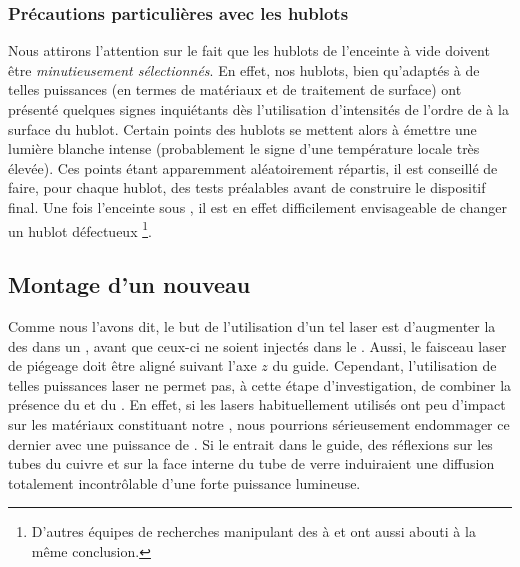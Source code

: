 \subsubsection{Précautions particulières avec les hublots}
Nous attirons l'attention sur le fait que les hublots de l'enceinte à vide doivent être \emph{minutieusement sélectionnés}. En effet, nos hublots, bien qu'adaptés à de telles puissances (en termes de matériaux et de traitement de surface) ont présenté quelques signes inquiétants dès l'utilisation d'intensités de l'ordre de  à la surface du hublot. Certain points des hublots se mettent alors à émettre une lumière blanche intense (probablement le signe d'une température locale très élevée). Ces points étant apparemment aléatoirement répartis, il est conseillé de faire, pour chaque hublot, des tests préalables avant de construire le dispositif final. Une fois l'enceinte sous \uv, il est en effet difficilement envisageable de changer un hublot défectueux%
\footnote{D'autres équipes de recherches manipulant des \ldps à  et  ont aussi abouti à la même conclusion.}.


\subsection{Montage d'un nouveau \setup}
Comme nous l'avons dit, le but de l'utilisation d'un tel laser est d'augmenter la \dat des \ns dans un \pd, avant que ceux-ci ne soient injectés dans le \gm. Aussi, le faisceau laser de piégeage doit être aligné suivant l'axe $z$ du guide. 
Cependant, l'utilisation de telles puissances laser ne permet pas, à cette étape d'investigation, de  combiner la présence du \lyb et du \gm. En effet, si les lasers habituellement utilisés ont peu d'impact sur les matériaux constituant notre \setup, nous pourrions sérieusement endommager ce dernier avec une puissance de .
Si le \fl entrait dans le guide, des réflexions sur les tubes du cuivre et sur la face interne du tube de verre induiraient une diffusion totalement incontrôlable d'une forte puissance lumineuse.


\casse

